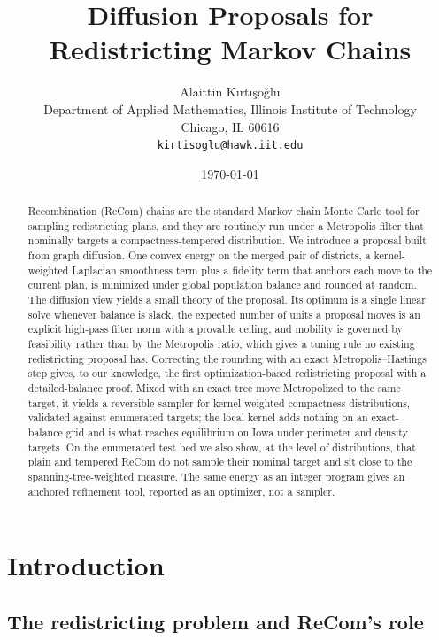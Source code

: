 \documentclass[11pt]{article}
\title{Diffusion Proposals for Redistricting Markov Chains}
\author{Alaittin K\i rt\i \c{s}o\u{g}lu \\
        \small Department of Applied Mathematics, Illinois Institute of Technology \\
        \small Chicago, IL 60616 \\
        \small \texttt{kirtisoglu@hawk.iit.edu}}
\date{\today}
\begin{document}
\maketitle

\begin{abstract}
Recombination (ReCom) chains are the standard Markov chain Monte
Carlo tool for sampling redistricting plans, and they are routinely
run under a Metropolis filter that nominally targets a
compactness-tempered distribution. We introduce a proposal built from
graph diffusion. One convex energy on the merged pair of districts, a
kernel-weighted Laplacian smoothness term plus a fidelity term that
anchors each move to the current plan, is minimized under global
population balance and rounded at random. The diffusion view yields a
small theory of the proposal. Its optimum is a single linear solve
whenever balance is slack, the expected number of units a proposal
moves is an explicit high-pass filter norm with a provable ceiling,
and mobility is governed by feasibility rather than by the Metropolis
ratio, which gives a tuning rule no existing redistricting proposal
has. Correcting the rounding with an exact Metropolis--Hastings step
gives, to our knowledge, the first optimization-based redistricting
proposal with a detailed-balance proof. Mixed with an exact tree move
Metropolized to the same target, it yields a reversible sampler for
kernel-weighted compactness distributions, validated against
enumerated targets; the local kernel adds nothing on an exact-balance
grid and is what reaches equilibrium on Iowa under perimeter and
density targets. On the enumerated test bed we also show, at the
level of distributions, that plain and tempered ReCom do not sample
their nominal target and sit close to the spanning-tree-weighted
measure. The same energy as an integer program gives an anchored
refinement tool, reported as an optimizer, not a sampler.
\end{abstract}

\section{Introduction}\label{sec:intro}

\subsection{The redistricting problem and ReCom's role}\label{sec:intro-problem}
\end{document}
